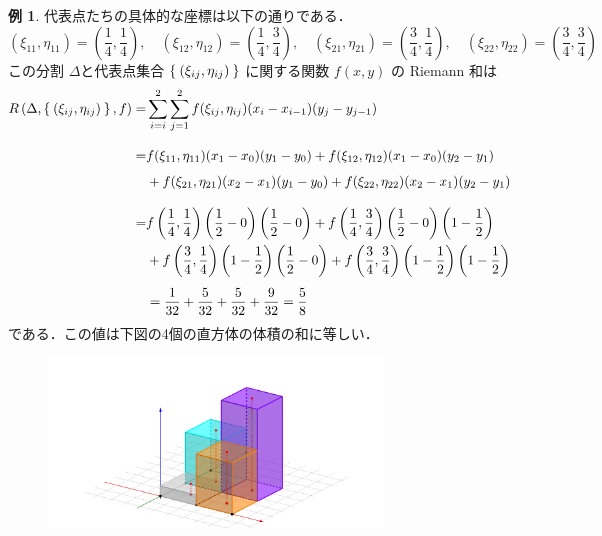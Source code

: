\documentclass[10pt, uplatex, dvipdfmx]{jsarticle}
\theoremstyle{definition}
\newtheorem{example}[theorem]{例}
\numberwithin{equation}{section}
\begin{document}
\begin{example}
  \noindent 代表点たちの具体的な座標は以下の通りである．
  \[
    \left( \xi_{11}, \eta_{11}\right) = \left( \frac{1}{4},
      \frac{1}{4}\right), \quad \left( \xi_{12}, \eta_{12}\right) =
    \left( \frac{1}{4}, \frac{3}{4}\right), \quad \left(\xi_{21},
      \eta_{21}\right) = \left(\frac{3}{4}, \frac{1}{4}\right), \quad
    \left( \xi_{22}, \eta_{22}\right) = \left( \frac{3}{4},
      \frac{3}{4}\right)
  \]
  この分割 $\Delta$と代表点集合 $\Set{\left( \xi_{ij}, \eta_{ij}
    \right)}$ に関する関数 $f(x,y)$ の Riemann 和は
  \[
    \begin{aligned}
      R\left( \Delta, \Set{(\xi_{ij}, \eta_{ij})}, f\right)
      =& \sum_{i=i}^{2} \sum_{j=1}^{2} f( \xi_{ij}, \eta_{ij}) (x_{i} - x_{i-1}) (y_{j} - y_{j-1})\\[2ex]
       =& f(\xi_{11}, \eta_{11})(x_1-x_0)(y_1-y_0) + f(\xi_{12}, \eta_{12}) (x_1-x_0)(y_2-y_1)\\[1ex]
       &+ f(\xi_{21}, \eta_{21})(x_2-x_1)(y_1-y_0)+ f(\xi_{22}, \eta_{22})(x_2-x_1)(y_2-y_1)\\[2ex]
      =& f\left(\frac{1}{4}, \frac{1}{4}\right)\left(\frac{1}{2}-0\right)\left(\frac{1}{2}-0\right)
         + f\left(\frac{1}{4}, \frac{3}{4}\right)\left(\frac{1}{2}-0\right)\left(1-\frac{1}{2}\right)\\
       &+ f\left(\frac{3}{4}, \frac{1}{4}\right)\left(1-\frac{1}{2}\right)\left(\frac{1}{2}-0\right)
         + f\left(\frac{3}{4}, \frac{3}{4}\right)\left(1-\frac{1}{2}\right)\left(1-\frac{1}{2}\right)\\[1ex]
      &= \frac{1}{32} + \frac{5}{32} + \frac{5}{32} + \frac{9}{32} = \frac{5}{8}
    \end{aligned}
  \]
  である．この値は下図の4個の直方体の体積の和に等しい．
  \begin{figure}[h]
    \centering
    \includegraphics[height=4.5cm]{./pictures/07/boxes3D.png}                                                
  \end{figure}
  
\end{example}
\end{document}
